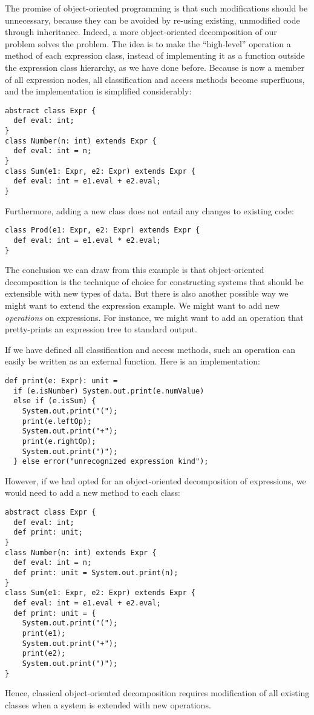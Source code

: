 \documentclass[a4paper,12pt,twoside,titlepage]{book}
\begin{document}
The promise of object-oriented programming is that such modifications
should be unnecessary, because they can be avoided by re-using
existing, unmodified code through inheritance. Indeed, a more
object-oriented decomposition of our problem solves the problem.  The
idea is to make the ``high-level'' operation  a method of
each expression class, instead of implementing it as a function
outside the expression class hierarchy, as we have done
before. Because  is now a member of all expression nodes,
all classification and access methods become superfluous, and the implementation is simplified considerably:
\begin{lstlisting}
abstract class Expr {
  def eval: int;
}
class Number(n: int) extends Expr {
  def eval: int = n;
}
class Sum(e1: Expr, e2: Expr) extends Expr {
  def eval: int = e1.eval + e2.eval;
}
\end{lstlisting}
Furthermore, adding a new  class does not entail any changes to existing code:
\begin{lstlisting}
class Prod(e1: Expr, e2: Expr) extends Expr {
  def eval: int = e1.eval * e2.eval;
}
\end{lstlisting}

The conclusion we can draw from this example is that object-oriented
decomposition is the technique of choice for constructing systems that
should be extensible with new types of data. But there is also another
possible way we might want to extend the expression example. We might
want to add new {\em operations} on expressions.  For instance, we might
want to add an operation that pretty-prints an expression tree to standard output.

If we have defined all classification and access methods, such an
operation can easily be written as an external function. Here is an
implementation:
\begin{lstlisting}
def print(e: Expr): unit = 
  if (e.isNumber) System.out.print(e.numValue)
  else if (e.isSum) {
    System.out.print("("); 
    print(e.leftOp); 
    System.out.print("+");
    print(e.rightOp);
    System.out.print(")");
  } else error("unrecognized expression kind");
\end{lstlisting}
However, if we had opted for an object-oriented decomposition of
expressions, we would need to add a new  method
to each class:
\begin{lstlisting}
abstract class Expr {
  def eval: int;
  def print: unit;
}
class Number(n: int) extends Expr {
  def eval: int = n;
  def print: unit = System.out.print(n);
}
class Sum(e1: Expr, e2: Expr) extends Expr {
  def eval: int = e1.eval + e2.eval;
  def print: unit = {
    System.out.print("("); 
    print(e1); 
    System.out.print("+");
    print(e2);
    System.out.print(")");
}
\end{lstlisting}
Hence, classical object-oriented decomposition requires modification
of all existing classes when a system is extended with new operations.
\end{document}
